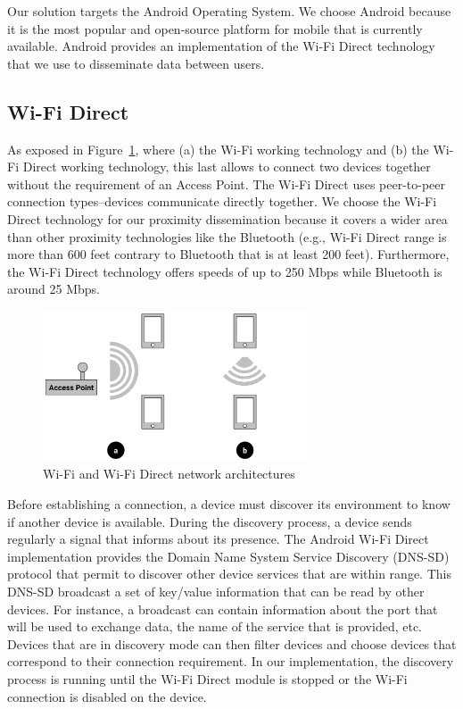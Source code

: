 

Our solution targets the Android Operating System.
We choose Android because it is the most popular and open-source platform for mobile that is currently available.
Android provides an implementation of the Wi-Fi Direct technology that we use to disseminate data between users.

\subsection{Wi-Fi Direct}

As exposed in Figure~\ref{WiFiVsWiFiDi}, where (a) the Wi-Fi working technology and (b) the Wi-Fi Direct working technology, this last allows to connect two devices together without the requirement of an Access Point.
The Wi-Fi Direct uses peer-to-peer connection types--devices communicate directly together.
We choose the Wi-Fi Direct technology for our proximity dissemination because it covers a wider area than other proximity technologies like the Bluetooth (e.g., Wi-Fi Direct range is more than 600 feet contrary to Bluetooth that is at least 200 feet).
Furthermore, the Wi-Fi Direct technology offers speeds of up to 250 Mbps while Bluetooth is around 25 Mbps.

\begin{figure}[h]
	\centering
	\includegraphics[width=0.7\textwidth]{figures/wifivswifidirect}
	\caption{\label{WiFiVsWiFiDi}Wi-Fi and Wi-Fi Direct network architectures}
\end{figure}

Before establishing a connection, a device must discover its environment to know if another device is available.
During the discovery process, a device sends regularly a signal that informs about its presence.
The Android Wi-Fi Direct implementation provides the Domain Name System Service Discovery (DNS-SD) protocol that permit to discover other device services that are within range.
This DNS-SD broadcast a set of key/value information that can be read by other devices.
For instance, a broadcast can contain information about the port that will be used to exchange data, the name of the service that is provided, etc.
Devices that are in discovery mode can then filter devices and choose devices that correspond to their connection requirement.
In our implementation, the discovery process is running until the Wi-Fi Direct module is stopped or the Wi-Fi connection is disabled on the device.
\\

